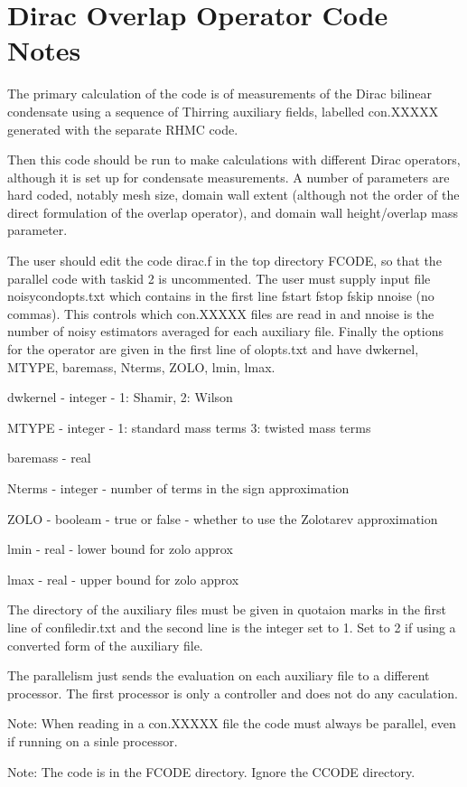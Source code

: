 \documentclass[11pt]{article}
\begin{document}
\section{Dirac Overlap Operator Code Notes}

The primary calculation of the code is of measurements of the Dirac bilinear condensate using a sequence of Thirring auxiliary fields, labelled con.XXXXX generated with the separate RHMC code. 

Then this code should be run to make calculations with different Dirac operators, although it is set up for condensate measurements. A number of parameters are hard coded, notably mesh size, domain wall extent (although not the order of the direct formulation of the overlap operator), and domain wall height/overlap mass parameter.

The user should edit the code dirac.f in the top directory FCODE, so that the parallel code with taskid 2 is uncommented. The user must supply input file noisycondopts.txt which contains in the first line fstart fstop fskip nnoise (no commas). This controls which con.XXXXX files are read in and nnoise is the number of noisy estimators averaged for each auxiliary file. Finally the options for the operator are given in the first line of olopts.txt and have dwkernel, MTYPE, baremass, Nterms, ZOLO, lmin, lmax. 

dwkernel - integer - 1: Shamir, 2: Wilson

MTYPE - integer - 1: standard mass terms 3: twisted mass terms

baremass - real 

Nterms - integer - number of terms in the sign approximation

ZOLO - booleam - true or false - whether to use the Zolotarev approximation

lmin - real - lower bound for zolo approx

lmax - real - upper bound for zolo approx

The directory of the auxiliary files must be given in quotaion marks in the first line of confiledir.txt and the second line is the integer set to 1. Set to 2 if using a converted form of the auxiliary file.

The parallelism just sends the evaluation on each auxiliary file to a different processor. The first processor is only a controller and does not do any caculation. 

Note: When reading in a con.XXXXX file the code must always be parallel, even if running on a sinle processor.

Note: The code is in the FCODE directory. Ignore the CCODE directory.
\end{document}
